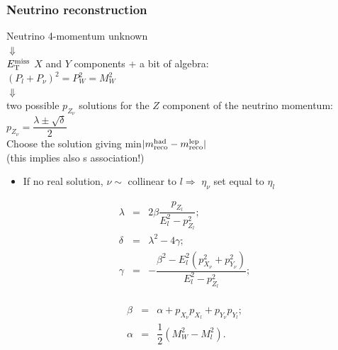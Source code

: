 
\begin{frame}\frametitle{Neutrino reconstruction}
\centering\footnotesize

Neutrino 4-momentum unknown \\
{\large $\Downarrow$}\\
$\met$ $X$ and $Y$ components + a bit of algebra:\\
$(P_l + P_{\nu})^2 = P_W^2 = M_W^2$\\
{\large $\Downarrow$}\\
two possible $p_{Z_\nu}$ solutions for the 
$Z$ component of the neutrino momentum:\\
$p_{Z_\nu} = \dfrac{\lambda \pm \sqrt{\delta} }{2}$\\

\myskip
Choose the solution giving min$|m_{\rm reco}^{\rm had} - m_{\rm reco}^{\rm lep}|$\\
(this implies also \bjet s association!)

\begin{itemize}
\item If no real solution, $\nu\sim$ collinear to $l \Rightarrow$  $\eta_{\nu}$ set equal to $\eta_{l}$
\end{itemize}

\begin{minipage}{.5\textwidth}\centering
{\scriptsize
\begin{eqnarray*}
\lambda &=& 2\beta \dfrac{p_{Z_l}}{E_l^2-p_{Z_l}^2};\\
\delta  &=& \lambda^2 - 4\gamma;\\
\gamma &=& -\dfrac{\beta^2 - E_l^2 (p_{X_\nu}^2+p_{Y_\nu}^2)}{E_l^2-p_{Z_l}^2}; \\
\end{eqnarray*}
}
\end{minipage}\begin{minipage}{.5\textwidth}\centering
{\scriptsize
\begin{eqnarray*}
\beta  &=& \alpha + p_{X_\nu}p_{X_l} + p_{Y_\nu}p_{Y_l}; \\
\alpha &=& \dfrac{1}{2}(M_W^2 - M_l^2).
\end{eqnarray*}
}
\end{minipage}

\end{frame}



